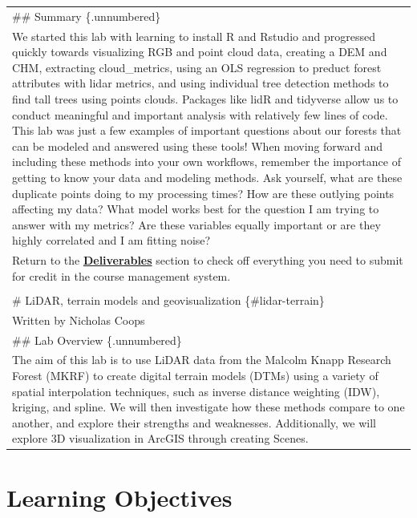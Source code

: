 \documentclass[
]{book}
\begin{document}
\begin{longtable}[]{@{}
  >{\raggedright\arraybackslash}p{}@{}}
\toprule\noalign{}
\endhead
\bottomrule\noalign{}
\endlastfoot
\#\# Summary \{.unnumbered\} \\
We started this lab with learning to install R and Rstudio and progressed quickly towards visualizing RGB and point cloud data, creating a DEM and CHM, extracting cloud\_metrics, using an OLS regression to preduct forest attributes with lidar metrics, and using individual tree detection methods to find tall trees using points clouds. Packages like lidR and tidyverse allow us to conduct meaningful and important analysis with relatively few lines of code. This lab was just a few examples of important questions about our forests that can be modeled and answered using these tools! When moving forward and including these methods into your own workflows, remember the importance of getting to know your data and modeling methods. Ask yourself, what are these duplicate points doing to my processing times? How are these outlying points affecting my data? What model works best for the question I am trying to answer with my metrics? Are these variables equally important or are they highly correlated and I am fitting noise? \\
Return to the \protect\hyperlink{lab3-deliverables}{\textbf{Deliverables}} section to check off everything you need to submit for credit in the course management system. \\
 \\
\# LiDAR, terrain models and geovisualization \{\#lidar-terrain\} \\
Written by
Nicholas Coops \\
\#\# Lab Overview \{.unnumbered\} \\
The aim of this lab is to use LiDAR data from the Malcolm Knapp Research Forest (MKRF) to create digital terrain models (DTMs) using a variety of spatial interpolation techniques, such as inverse distance weighting (IDW), kriging, and spline. We will then investigate how these methods compare to one another, and explore their strengths and weaknesses. Additionally, we will explore 3D visualization in ArcGIS through creating Scenes. \\
\end{longtable}

\hypertarget{learning-objectives-3}{%
\section*{Learning Objectives}\label{learning-objectives-3}}
\end{document}
